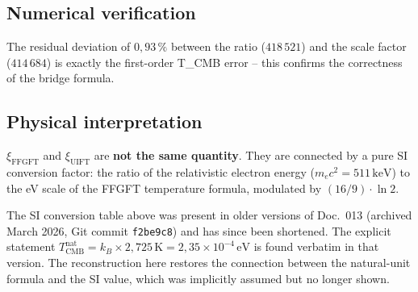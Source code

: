 \subsection*{Numerical verification}

\begin{center}
\renewcommand{\arraystretch}{1.35}
{\small
{}
}
\end{center}

The residual deviation of $0{,}93\,\%$ between the ratio ($418\,521$) and the
scale factor ($414\,684$) is exactly the first-order T\_CMB error -- this
confirms the correctness of the bridge formula.

\subsection*{Physical interpretation}

$\xi_\text{FFGFT}$ and $\xi_\text{UIFT}$ are \textbf{not the same quantity}.
They are connected by a pure SI conversion factor: the ratio of the
relativistic electron energy ($m_ec^2 = 511\,\text{keV}$) to the eV scale of
the FFGFT temperature formula, modulated by $(16/9)\cdot\ln 2$.

The SI conversion table above was present in older versions of Doc.~013
(archived March 2026, Git commit \texttt{f2be9c8}) and has since been
shortened. The explicit statement
$T_\text{CMB}^\text{nat} = k_B \times 2{,}725\,\text{K} = 2{,}35\times10^{-4}\,\text{eV}$
is found verbatim in that version. The reconstruction here restores the
connection between the natural-unit formula and the SI value, which was
implicitly assumed but no longer shown.

